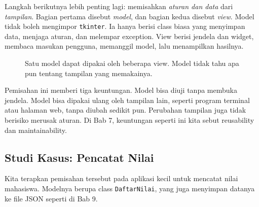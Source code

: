 Langkah berikutnya lebih penting lagi: memisahkan \emph{aturan dan data} dari \emph{tampilan}. Bagian pertama disebut \emph{model}, dan bagian kedua disebut \emph{view}. Model tidak boleh mengimpor \texttt{tkinter}. Ia hanya berisi class biasa yang menyimpan data, menjaga aturan, dan melempar exception. View berisi jendela dan widget, membaca masukan pengguna, memanggil model, lalu menampilkan hasilnya.

\begin{figure}[htbp]
\centering
{}
\caption{Satu model dapat dipakai oleh beberapa view. Model tidak tahu apa pun tentang tampilan yang memakainya.}
\end{figure}

Pemisahan ini memberi tiga keuntungan. Model bisa diuji tanpa membuka jendela. Model bisa dipakai ulang oleh tampilan lain, seperti program terminal atau halaman web, tanpa diubah sedikit pun. Perubahan tampilan juga tidak berisiko merusak aturan. Di Bab 7, keuntungan seperti ini kita sebut reusability dan maintainability.

\subsection{Studi Kasus: Pencatat Nilai}

Kita terapkan pemisahan tersebut pada aplikasi kecil untuk mencatat nilai mahasiswa. Modelnya berupa class \texttt{DaftarNilai}, yang juga menyimpan datanya ke file JSON seperti di Bab 9.

